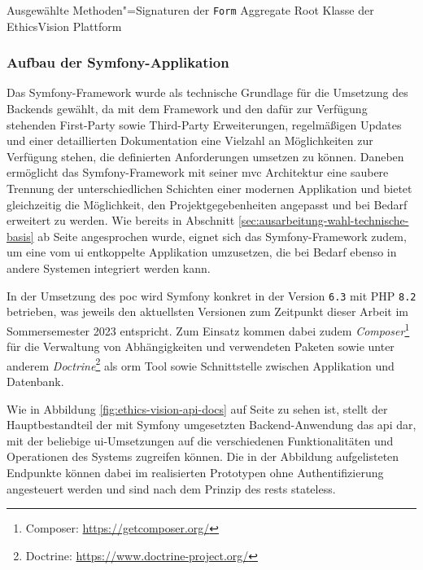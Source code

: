 \documentclass[a4paper,12pt,twoside]{scrreprt}
\begin{document}
\begin{listing}[ht]
    \inputminted[fontsize=\footnotesize,linenos,xleftmargin=8mm]{php}{code/Luidold_Form-Aggregate-Root.php}
    \caption{Ausgewählte Methoden"=Signaturen der \texttt{Form} Aggregate Root Klasse der EthicsVision Plattform}
    \label{code:form-aggregate-root}
\end{listing}

\subsubsection*{Aufbau der Symfony-Applikation}
\label{sub-sub-sec:aufbau-symfony-applikation}

Das Symfony-Framework wurde als technische Grundlage für die Umsetzung des Backends gewählt, da mit dem Framework und den dafür zur Verfügung stehenden First-Party sowie Third-Party Erweiterungen, regelmäßigen Updates und einer detaillierten Dokumentation eine Vielzahl an Möglichkeiten zur Verfügung stehen, die definierten Anforderungen umsetzen zu können. Daneben ermöglicht das Symfony-Framework mit seiner \acl{mvc} Architektur eine saubere Trennung der unterschiedlichen Schichten einer modernen Applikation und bietet gleichzeitig die Möglichkeit, den Projektgegebenheiten angepasst und bei Bedarf erweitert zu werden. Wie bereits in Abschnitt \ref{sec:ausarbeitung-wahl-technische-basis} ab Seite \pageref{sec:ausarbeitung-wahl-technische-basis} angesprochen wurde, eignet sich das Symfony-Framework zudem, um eine vom \acl{ui} entkoppelte Applikation umzusetzen, die bei Bedarf ebenso in andere Systemen integriert werden kann. \cite{symfony_sas_six-reasons_2023, kszczanowicz_why_2021} 

In der Umsetzung des \ac{poc} wird Symfony konkret in der Version \texttt{6.3} mit PHP \texttt{8.2} betrieben, was jeweils den aktuellsten Versionen zum Zeitpunkt dieser Arbeit im Sommersemester 2023 entspricht. Zum Einsatz kommen dabei zudem \textit{Composer}\footnote{Composer: \url{https://getcomposer.org/}} für die Verwaltung von Abhängigkeiten und verwendeten Paketen sowie unter anderem \textit{Doctrine}\footnote{Doctrine: \url{https://www.doctrine-project.org/}} als \ac{orm} Tool sowie Schnittstelle zwischen Applikation und Datenbank.

\medskip

Wie in Abbildung \ref{fig:ethics-vision-api-docs} auf Seite \pageref{fig:ethics-vision-api-docs} zu sehen ist, stellt der Hauptbestandteil der mit Symfony umgesetzten Backend-Anwendung das \ac{api} dar, mit der beliebige \ac{ui}-Umsetzungen auf die verschiedenen Funktionalitäten und Operationen des Systems zugreifen können. Die in der Abbildung aufgelisteten Endpunkte können dabei im realisierten Prototypen ohne Authentifizierung angesteuert werden und sind nach dem Prinzip des \acp{rest} stateless. \cite{gupta_stateless_2018}
\end{document}
